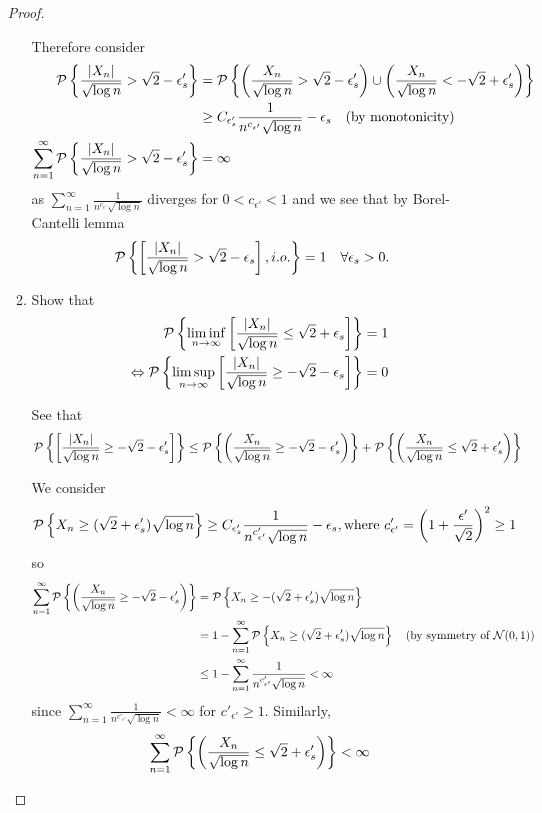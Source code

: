\documentclass[11pt]{article}
\begin{document}
\begin{itemize}
\begin{proof}
\begin{enumerate}
Therefore consider
\begin{align*}
{\mathcal P}\left\{ \frac{\left\lvert X_{n} \right\rvert}{\sqrt{\log n}}>  \sqrt{2}-\epsilon'_{s} \right\}
&= {\mathcal P}\left\{ \left(\frac{X_{n}}{\sqrt{\log n}}>  \sqrt{2}-\epsilon'_{s}\right)\cup  \left(\frac{X_{n}}{\sqrt{\log n}} <  -\sqrt{2}+\epsilon'_{s}\right) \right\}\\
&\ge  C_{\epsilon'_{s}}\frac{1}{n^{c_{\epsilon'}}\sqrt{\log n}}-\epsilon_{s}\quad  (\text{by monotonicity})\\
\sum_{n=1}^{\infty}{\mathcal P}\left\{ \frac{\left\lvert X_{n} \right\rvert}{\sqrt{\log n}}>  \sqrt{2}-\epsilon'_{s} \right\} &=\infty
\end{align*} as $\sum_{n=1}^{\infty}\frac{1}{n^{c_{\epsilon'}}\sqrt{\log n}}$ diverges for $0<c_{\epsilon'}<1$ and we see that by Borel-Cantelli lemma
\begin{align*}
{\mathcal P}\left\{\left[\frac{\left\lvert X_{n} \right\rvert}{\sqrt{\log n}}>  \sqrt{2}-\epsilon_{s}\right], i.o.\right\} &=1\quad \forall \epsilon_{s}>0.
\end{align*}

\item Show that
\begin{align*}
{\mathcal P}\left\{\liminf\limits_{n\rightarrow \infty}\left[\frac{\left\lvert X_{n} \right\rvert}{\sqrt{\log n}}\le  \sqrt{2}+\epsilon_{s}\right]\right\} &= 1\\
\Leftrightarrow {\mathcal P}\left\{\limsup\limits_{n\rightarrow \infty}\left[\frac{\left\lvert X_{n} \right\rvert}{\sqrt{\log n}}\ge  -\sqrt{2}-\epsilon_{s}\right]\right\} &= 0
\end{align*}

See that 
\begin{align*}
{\mathcal P}\left\{\left[\frac{\left\lvert X_{n} \right\rvert}{\sqrt{\log n}}\ge  -\sqrt{2}-\epsilon'_{s}\right]\right\}
&\le {\mathcal P}\left\{ \left(\frac{X_{n}}{\sqrt{\log n}}\ge  -\sqrt{2}-\epsilon'_{s}\right)\right\}+{\mathcal P}\left\{\left(\frac{X_{n}}{\sqrt{\log n}} \le  \sqrt{2}+\epsilon'_{s}\right) \right\}
\end{align*}

We consider 
\begin{align*}
{\mathcal P}\left\{X_{n}\ge  (\sqrt{2}+\epsilon'_{s})\sqrt{\log n} \right\}&\ge 
C_{\epsilon'_{s}}\frac{1}{n^{c'_{\epsilon'}}\sqrt{\log n}}-\epsilon_{s}, \text{where }c'_{\epsilon'} = \left(1+\frac{\epsilon'}{\sqrt{2}}\right)^{2}\ge 1
\end{align*}
so
\begin{align*}
\sum_{n=1}^{\infty}{\mathcal P}\left\{\left(\frac{X_{n}}{\sqrt{\log n}} \ge  -\sqrt{2}-\epsilon'_{s}\right) \right\}&= {\mathcal P}\left\{X_{n}\ge  -(\sqrt{2}+\epsilon'_{s})\sqrt{\log n} \right\}\\
&= 1- \sum_{n=1}^{\infty}{\mathcal P}\left\{X_{n}\ge  (\sqrt{2}+\epsilon'_{s})\sqrt{\log n} \right\} \quad(\text{by symmetry of }{\mathcal N}(0,1))\\
&\le 1- \sum_{n=1}^{\infty}\frac{1}{n^{c'_{\epsilon'}}\sqrt{\log n}} <\infty
\end{align*}
since $\sum_{n=1}^{\infty}\frac{1}{n^{c'_{\epsilon'}}\sqrt{\log n}} <\infty$ for $c'_{\epsilon'} \ge 1$.
Similarly, 
$$
\sum_{n=1}^{\infty}{\mathcal P}\left\{\left(\frac{X_{n}}{\sqrt{\log n}} \le  \sqrt{2}+\epsilon'_{s}\right) \right\} <\infty
$$


\end{enumerate}
\end{proof}
\end{itemize}
\end{document}
